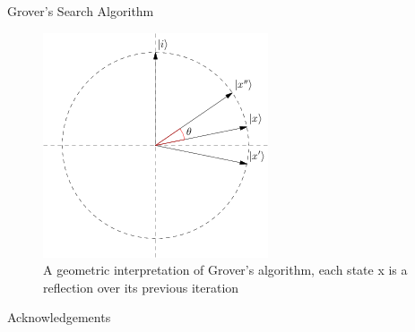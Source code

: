 \documentclass[final, 20pt]{beamer}
\newlength{\onecolwid}
\begin{document}
\begin{frame}[t]
\begin{columns}[t]
\begin{column}{\onecolwid}
\begin{block}{Grover's Search Algorithm}
\begin{figure}
\includegraphics[width=0.3\linewidth]{a.png}
\caption{A geometric interpretation of Grover's algorithm, each state x is a reflection over its previous iteration}
\end{figure}

\end{block}


\begin{block}{Acknowledgements}

\small{} \\

\end{block}


\end{column} %

\end{columns} %

\end{frame} %
\end{document}
